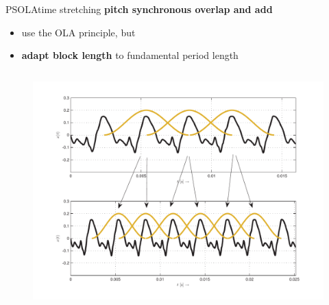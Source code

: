     \begin{frame}{PSOLA}{time stretching}
            \textbf{pitch synchronous overlap and add}
            \begin{itemize}
                \item   use the OLA principle, but
                \item	\textbf{adapt block length} to fundamental period length
            \end{itemize}
            \pause
            \begin{columns}
                \column{6cm}\vspace{-5mm}
                    \begin{figure}
                        \centering
                        \includegraphics[scale=.3]{graph/PSOLA.pdf}
                    \end{figure}\vspace{-5mm}


\end{columns}
\end{frame}
